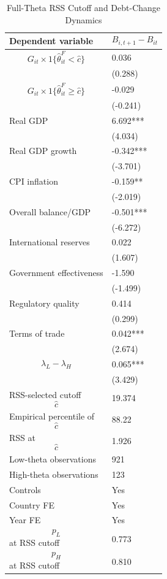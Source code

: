 \begin{table}[H]\centering
\begin{threeparttable}
\caption{Full-Theta RSS Cutoff and Debt-Change Dynamics}
\label{tab:deltaB_rss_cutoff_fulltheta}
\scriptsize
\begin{tabularx}{\textwidth}{lY}
\toprule
Dependent variable & $$B_{i,t+1}-B_{it}$$ \\
\midrule
$$G_{it}\times 1\{\widehat{\theta}^{F}_{it}<\widehat{c}\}$$ & 0.036 \\
 & (0.288) \\
$$G_{it}\times 1\{\widehat{\theta}^{F}_{it}\geq\widehat{c}\}$$ & -0.029 \\
 & (-0.241) \\
Real GDP & 6.692*** \\
 & (4.034) \\
Real GDP growth & -0.342*** \\
 & (-3.701) \\
CPI inflation & -0.159** \\
 & (-2.019) \\
Overall balance/GDP & -0.501*** \\
 & (-6.272) \\
International reserves & 0.022 \\
 & (1.607) \\
Government effectiveness & -1.590 \\
 & (-1.499) \\
Regulatory quality & 0.414 \\
 & (0.299) \\
Terms of trade & 0.042*** \\
 & (2.674) \\
$$\lambda_L-\lambda_H$$ & 0.065*** \\
 & (3.429) \\
\midrule
RSS-selected cutoff $$\widehat{c}$$ & 19.374 \\
Empirical percentile of $$\widehat{c}$$ & 88.22 \\
RSS at $$\widehat{c}$$ & 1.926 \\
Low-theta observations & 921 \\
High-theta observations & 123 \\
Controls & Yes \\
Country FE & Yes \\
Year FE & Yes \\
$$p_L$$ at RSS cutoff & 0.773 \\
$$p_H$$ at RSS cutoff & 0.810 \\

\end{tabularx}
\end{threeparttable}
\end{table}
